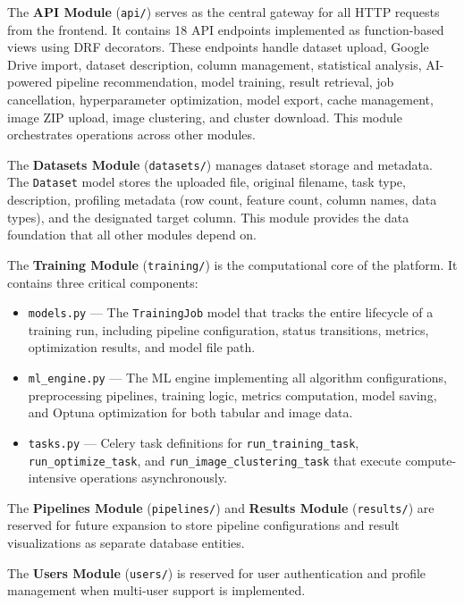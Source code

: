 \documentclass[12pt,a4paper]{report}
\begin{document}
The \textbf{API Module} (\texttt{api/}) serves as the central gateway for all HTTP requests from the frontend. It contains 18 API endpoints implemented as function-based views using DRF decorators. These endpoints handle dataset upload, Google Drive import, dataset description, column management, statistical analysis, AI-powered pipeline recommendation, model training, result retrieval, job cancellation, hyperparameter optimization, model export, cache management, image ZIP upload, image clustering, and cluster download. This module orchestrates operations across other modules.

The \textbf{Datasets Module} (\texttt{datasets/}) manages dataset storage and metadata. The \texttt{Dataset} model stores the uploaded file, original filename, task type, description, profiling metadata (row count, feature count, column names, data types), and the designated target column. This module provides the data foundation that all other modules depend on.

The \textbf{Training Module} (\texttt{training/}) is the computational core of the platform. It contains three critical components:
\begin{itemize}
    \item \texttt{models.py} — The \texttt{TrainingJob} model that tracks the entire lifecycle of a training run, including pipeline configuration, status transitions, metrics, optimization results, and model file path.
    \item \texttt{ml\_engine.py} — The ML engine implementing all algorithm configurations, preprocessing pipelines, training logic, metrics computation, model saving, and Optuna optimization for both tabular and image data.
    \item \texttt{tasks.py} — Celery task definitions for \texttt{run\_training\_task}, \texttt{run\_optimize\_task}, and \texttt{run\_image\_clustering\_task} that execute compute-intensive operations asynchronously.
\end{itemize}

The \textbf{Pipelines Module} (\texttt{pipelines/}) and \textbf{Results Module} (\texttt{results/}) are reserved for future expansion to store pipeline configurations and result visualizations as separate database entities.

The \textbf{Users Module} (\texttt{users/}) is reserved for user authentication and profile management when multi-user support is implemented.
\end{document}
